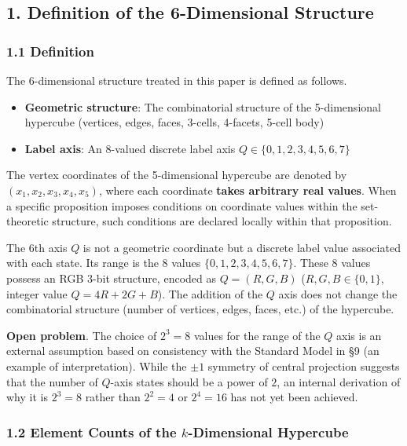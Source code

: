 \documentclass[
  a4paper,11pt]{article}
\providecommand{\tightlist}{%
  \setlength{\itemsep}{0pt}\setlength{\parskip}{0pt}}
\theoremstyle{definition}
\theoremstyle{remark}
\begin{document}
\subsection{1. Definition of the 6-Dimensional
Structure}\label{definition-of-the-6-dimensional-structure}

\subsubsection{1.1 Definition}\label{definition}

The 6-dimensional structure treated in this paper is defined as follows.

\begin{itemize}
\tightlist
\item
  \textbf{Geometric structure}: The combinatorial structure of the
  5-dimensional hypercube (vertices, edges, faces, 3-cells, 4-facets,
  5-cell body)
\item
  \textbf{Label axis}: An 8-valued discrete label axis
  \(Q \in \{0, 1, 2, 3, 4, 5, 6, 7\}\)
\end{itemize}

The vertex coordinates of the 5-dimensional hypercube are denoted by
\((x_1, x_2, x_3, x_4, x_5)\), where each coordinate \textbf{takes
arbitrary real values}. When a specific proposition imposes conditions
on coordinate values within the set-theoretic structure, such conditions
are declared locally within that proposition.

The 6th axis \(Q\) is not a geometric coordinate but a discrete label
value associated with each state. Its range is the 8 values
\(\{0, 1, 2, 3, 4, 5, 6, 7\}\). These 8 values possess an RGB 3-bit
structure, encoded as \(Q = (R, G, B)\) (\(R, G, B \in \{0, 1\}\),
integer value \(Q = 4R + 2G + B\)). The addition of the \(Q\) axis does
not change the combinatorial structure (number of vertices, edges,
faces, etc.) of the hypercube.

\textbf{Open problem}. The choice of \(2^3 = 8\) values for the range of
the \(Q\) axis is an external assumption based on consistency with the
Standard Model in §9 (an example of interpretation). While the \(\pm 1\)
symmetry of central projection suggests that the number of \(Q\)-axis
states should be a power of \(2\), an internal derivation of why it is
\(2^3 = 8\) rather than \(2^2 = 4\) or \(2^4 = 16\) has not yet been
achieved.

\subsubsection{\texorpdfstring{1.2 Element Counts of the
\(k\)-Dimensional
Hypercube}{1.2 Element Counts of the k-Dimensional Hypercube}}\label{element-counts-of-the-k-dimensional-hypercube}
\end{document}

